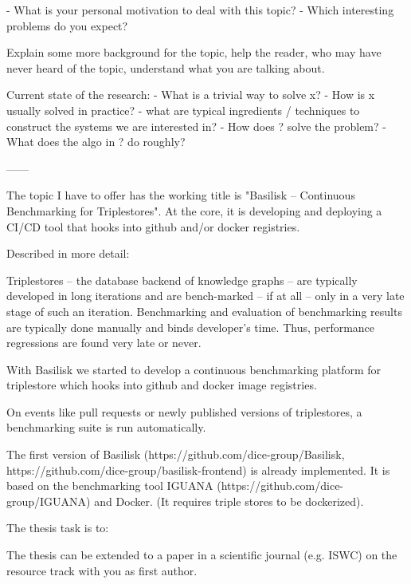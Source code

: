 - What is your personal motivation to deal with this topic?
- Which interesting problems do you expect?

Explain some more background for the topic, help the reader, who may have never heard of the topic, understand what you are talking about.

Current state of the research:
- What is a trivial way to solve x?
- How is x usually solved in practice?
- what are typical ingredients / techniques to construct the systems we are interested in?
- How does ? solve the problem?
- What does the algo in ? do roughly?


------

The topic I have to offer has the working title is "Basilisk -- Continuous Benchmarking for Triplestores". At the core, it is developing and deploying a CI/CD tool that hooks into github and/or docker registries.

Described in more detail:

Triplestores -- the database backend of knowledge graphs -- are
typically developed in long iterations and are bench-marked -- if at
all -- only in a very late stage of such an iteration. Benchmarking
and evaluation of benchmarking results are typically done manually
and binds developer's time. Thus, performance regressions are found
very late or never.

With Basilisk we started to develop a continuous benchmarking
platform for triplestore which hooks into github and docker image
registries.

On events like pull requests or newly published versions of
triplestores, a benchmarking suite is run automatically.

The first version of Basilisk
(https://github.com/dice-group/Basilisk,
https://github.com/dice-group/basilisk-frontend) is already
implemented. It is based on the benchmarking tool IGUANA
(https://github.com/dice-group/IGUANA) and Docker. (It requires
triple stores to be dockerized).

The thesis task is to:



The thesis can be extended to a paper in a scientific journal (e.g.
ISWC) on the resource track with you as first author. 

